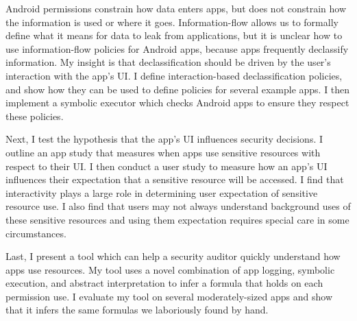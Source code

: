 Android permissions constrain how data enters apps, but does not
constrain how the information is used or where it
goes. Information-flow allows us to formally define what it means for
data to leak from applications, but it is unclear how to use
information-flow policies for Android apps, because apps frequently
declassify information. My insight is that declassification should be
driven by the user's interaction with the app's UI. I
define interaction-based declassification policies, and show how they
can be used to define policies for several example apps. I then
implement a symbolic executor which checks Android apps to ensure they
respect these policies.

Next, I test the hypothesis that the app's UI influences security
decisions. I outline an app study that measures when apps use
sensitive resources with respect to their UI. I then conduct a user
study to measure how an app's UI influences their expectation that a
sensitive resource will be accessed. I find that interactivity plays a
large role in determining user expectation of sensitive resource
use. I also find that users may not always understand background uses
of these sensitive resources and using them expectation requires
special care in some circumstances.

Last, I present a tool which can help a security auditor quickly
understand how apps use resources. My tool uses a novel combination of
app logging, symbolic execution, and abstract interpretation to infer
a formula that holds on each permission use. I evaluate my tool on
several moderately-sized apps and show that it infers the same
formulas we laboriously found by hand.

